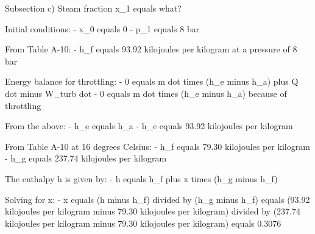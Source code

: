 Subsection c) Steam fraction x_1 equals what?

Initial conditions:
- x_0 equals 0
- p_1 equals 8 bar

From Table A-10:
- h_f equals 93.92 kilojoules per kilogram at a pressure of 8 bar

Energy balance for throttling:
- 0 equals m dot times (h_e minus h_a) plus Q dot minus W_turb dot
- 0 equals m dot times (h_e minus h_a) because of throttling

From the above:
- h_e equals h_a
- h_e equals 93.92 kilojoules per kilogram

From Table A-10 at 16 degrees Celsius:
- h_f equals 79.30 kilojoules per kilogram
- h_g equals 237.74 kilojoules per kilogram

The enthalpy h is given by:
- h equals h_f plus x times (h_g minus h_f)

Solving for x:
- x equals (h minus h_f) divided by (h_g minus h_f) equals (93.92 kilojoules per kilogram minus 79.30 kilojoules per kilogram) divided by (237.74 kilojoules per kilogram minus 79.30 kilojoules per kilogram) equals 0.3076